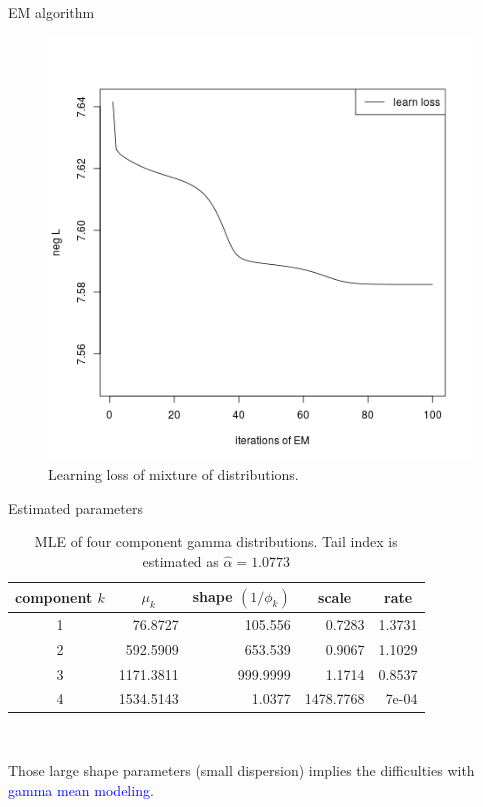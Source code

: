 \documentclass[11pt]{article}
\numberwithin{equation}{section}
\newcommand{\blue}[1]{\textcolor{blue}{#1}}
\begin{document}
\begin{frame}{EM algorithm}
	\begin{figure}[h!]
		\centering
		\includegraphics[width=0.35\linewidth]{../plots/sev/null_trace}
		\caption{Learning loss of mixture of distributions.}\label{null_sev}
	\end{figure}
\end{frame}

\begin{frame}{Estimated parameters}	\begin{table}[h!]
		\centering
		\caption{MLE of four component gamma distributions. Tail index is estimated as $\hat{\alpha}=1.0773$}\label{null-gamma}
		\begin{tabular}{crrrr}
			\hline
			component $k$ & \multicolumn{1}{c}{$\mu_k$} & \multicolumn{1}{c}{shape $(1/\phi_k)$} & \multicolumn{1}{c}{scale} & \multicolumn{1}{c}{rate} \\ \hline
			1         & 76.8727                & 105.556                   & 0.7283                    & 1.3731                   \\
			2         & 592.5909               & 653.539                   & 0.9067                    & 1.1029                   \\
			3         & 1171.3811              & 999.9999                  & 1.1714                    & 0.8537                   \\
			4         & 1534.5143              & 1.0377                    & 1478.7768                 & 7e-04                    \\ \hline
		\end{tabular}
	\end{table}
	
	~
	
	Those large shape parameters (small dispersion) implies the difficulties with \blue{gamma mean modeling}.
\end{frame}
\end{document}
